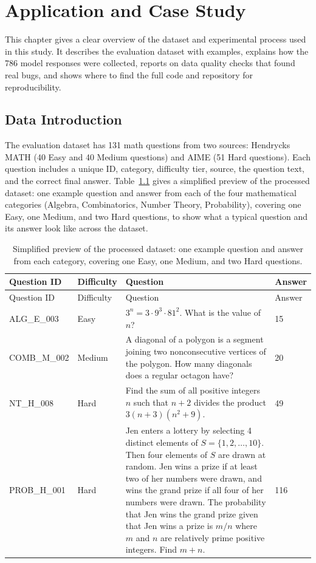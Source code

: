 \chapter{Application and Case Study}
\label{chap:case_study}

This chapter gives a clear overview of the dataset and experimental
process used in this study. It describes the evaluation dataset with
examples, explains how the 786 model responses were collected, reports on
data quality checks that found real bugs, and shows where to find the
full code and repository for reproducibility.

\section{Data Introduction}
\label{sec:data-intro}

The evaluation dataset has 131 math questions from two sources: Hendrycks
MATH (40 Easy and 40 Medium questions) and AIME (51 Hard questions). Each
question includes a unique ID, category, difficulty tier, source, the
question text, and the correct final answer.
Table~\ref{tab:examples-full} gives a simplified preview of the
processed dataset: one example question and answer from each of the four
mathematical categories (Algebra, Combinatorics, Number Theory,
Probability), covering one Easy, one Medium, and two Hard questions, to
show what a typical question and its answer look like across the
dataset.

\begin{longtable}{p{1.6cm}p{1.5cm}p{6.7cm}p{1.5cm}}
  \caption{Simplified preview of the processed dataset: one example question and answer from each category, covering one Easy, one Medium, and two Hard questions.} \label{tab:examples-full} \\
  \toprule
  Question ID & Difficulty & Question & Answer \\
  \midrule
  \endfirsthead
  \toprule
  Question ID & Difficulty & Question & Answer \\
  \midrule
  \endhead
  \bottomrule
  \endfoot
  ALG\_E\_003 & Easy &
    $3^n = 3 \cdot 9^3 \cdot 81^2$. What is the value of $n$? & 15 \\[4pt]
  COMB\_M\_002 & Medium &
    A diagonal of a polygon is a segment joining two nonconsecutive
    vertices of the polygon. How many diagonals does a regular octagon
    have? & 20 \\[4pt]
  NT\_H\_008 & Hard &
    Find the sum of all positive integers $n$ such that $n+2$ divides
    the product $3(n+3)(n^2+9)$. & 49 \\[4pt]
  PROB\_H\_001 & Hard &
    Jen enters a lottery by selecting 4 distinct elements of $S =
    \{1,2,\ldots,10\}$. Then four elements of $S$ are drawn at random.
    Jen wins a prize if at least two of her numbers were drawn, and
    wins the grand prize if all four of her numbers were drawn. The
    probability that Jen wins the grand prize given that Jen wins a
    prize is $m/n$ where $m$ and $n$ are relatively prime positive
    integers. Find $m+n$. & 116 \\
\end{longtable}

